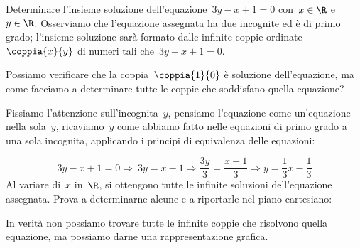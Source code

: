  \begin{esempio}{}{}
Determinare l'insieme soluzione dell'equazione~\(3y-x+1=0\) con~\(x\in\R\) 
e~\(y\in\R\).
Osserviamo che l'equazione assegnata ha due incognite ed
è di primo grado; l'insieme soluzione sarà formato
dalle infinite coppie ordinate~\(\coppia{x}{y}\) di numeri tali 
che~\(3y-x+1=0\).

Possiamo verificare che la coppia~\(\coppia{1}{0}\) è soluzione
dell'equazione, ma come facciamo a determinare tutte le
coppie che soddisfano quella equazione?

Fissiamo l'attenzione sull'incognita~\(y\),
pensiamo l'equazione come un'equazione
nella sola~\(y\), ricaviamo~\(y\) come abbiamo fatto nelle equazioni di 
primo grado a una sola incognita, applicando i principi di equivalenza 
delle equazioni:

\begin{equation*}
3y-x+1=0\Rightarrow~3y=x-1\Rightarrow\frac{3y}{3}=\frac{x-1}{3}\Rightarrow 
y=\frac{1}{3}x-\frac{1}{3}
\end{equation*}
Al variare di~\(x\) in~\(\R\), si ottengono tutte le infinite
soluzioni dell'equazione assegnata.
Prova a determinarne alcune e a riportarle nel piano cartesiano:


In verità non possiamo trovare tutte le infinite coppie che risolvono
quella equazione, ma possiamo darne una rappresentazione grafica.


\end{esempio}
